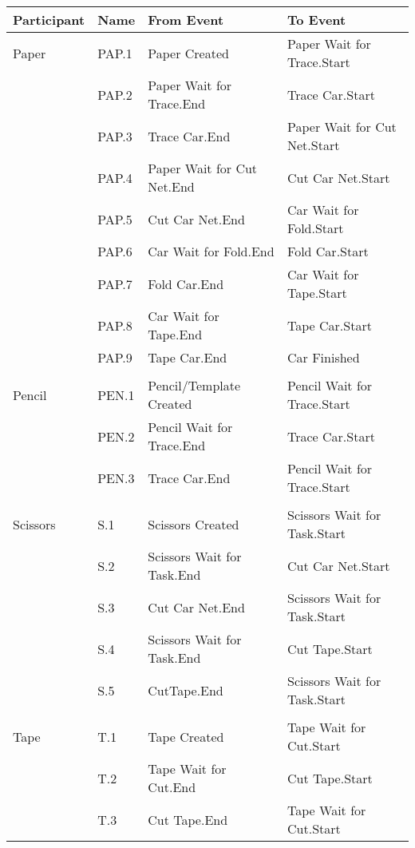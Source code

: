\begin{tabular}{p{2.4cm}>{\raggedright\arraybackslash}p{1.2cm}>{\raggedright\arraybackslash}p{5.9cm}>{\raggedright\arraybackslash}p{5.9cm}}
\toprule
Participant & Name & From Event & To Event       \\ \midrule
Paper & PAP.1 & Paper Created & Paper Wait for Trace.Start \\
      & PAP.2 & Paper Wait for Trace.End & Trace Car.Start \\
      & PAP.3 & Trace Car.End & Paper Wait for Cut Net.Start \\
      & PAP.4 & Paper Wait for Cut Net.End & Cut Car Net.Start \\
      & PAP.5 & Cut Car Net.End & Car Wait for Fold.Start \\
      & PAP.6 & Car Wait for Fold.End & Fold Car.Start \\
      & PAP.7 & Fold Car.End & Car Wait for Tape.Start \\
      & PAP.8 & Car Wait for Tape.End & Tape Car.Start \\
      & PAP.9 & Tape Car.End & Car Finished \\
      &      &              &              \\
Pencil & PEN.1 & Pencil/Template Created & Pencil Wait for Trace.Start \\
       & PEN.2 & Pencil Wait for Trace.End & Trace Car.Start \\
       & PEN.3 & Trace Car.End & Pencil Wait for Trace.Start \\
       &      &              &              \\
Scissors & S.1 & Scissors Created & Scissors Wait for Task.Start \\
       & S.2   & Scissors Wait for Task.End & Cut Car Net.Start \\
       & S.3   & Cut Car Net.End & Scissors Wait for Task.Start \\
       & S.4   & Scissors Wait for Task.End & Cut Tape.Start             \\
       & S.5   & CutTape.End & Scissors Wait for Task.Start \\
       &      &              &              \\
Tape   & T.1 & Tape Created & Tape Wait for Cut.Start \\
       & T.2 & Tape Wait for Cut.End & Cut Tape.Start \\
       & T.3 & Cut Tape.End & Tape Wait for Cut.Start \\

\end{tabular}
